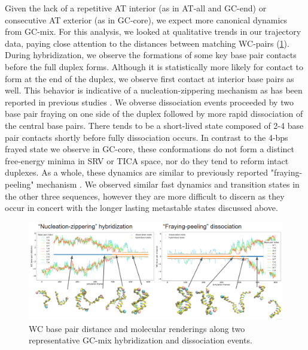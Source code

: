 \documentclass[journal=jpcbfk,manuscript=article]{achemso}
\begin{document}
Given the lack of a repetitive AT interior (as in AT-all and GC-end) or consecutive AT exterior (as in GC-core), we expect more canonical dynamics from GC-mix. For this analysis, we looked at qualitative trends in our trajectory data, paying close attention to the distances between matching WC-pairs (\ref{fig:GC-mix_transitions}). During hybridization, we observe the formations of some key base pair contacts before the full duplex forms. Although it is statistically more likely for contact to form at the end of the duplex, we observe first contact at interior base pairs as well. This behavior is indicative of a nucleation-zippering mechanism as has been reported in previous studies \citep{Yin2011KineticsHybridization, Porschke1971CooperativeTransition}. We obverse dissociation events proceeded by two base pair fraying on one side of the duplex followed by more rapid dissociation of the central base pairs. There tends to be a short-lived state composed of 2-4 base pair contacts shortly before fully dissociation occurs. In contrast to the 4-bps frayed state we observe in GC-core, these conformations do not form a distinct free-energy minima in SRV or TICA space, nor do they tend to reform intact duplexes. As a whole, these dynamics are similar to previously reported "fraying-peeling" mechanism \citep{Wong2008TheSimulations, Perez2010Real-timeUnfolding, Zgarbova2014BaseRNA}. We observed similar fast dynamics and transition states in the other three sequences, however they are more difficult to discern as they occur in concert with the longer lasting metastable states discussed above.

\begin{figure}[ht!]
	\begin{center}
        \includegraphics[width=\textwidth]{Figs/figs_0804/GC-mix_transitions.PNG}
        \caption{WC base pair distance and molecular renderings along two representative GC-mix hybridization and dissociation events.}
        \label{fig:GC-mix_transitions}
	\end{center}
\end{figure}
\end{document}
